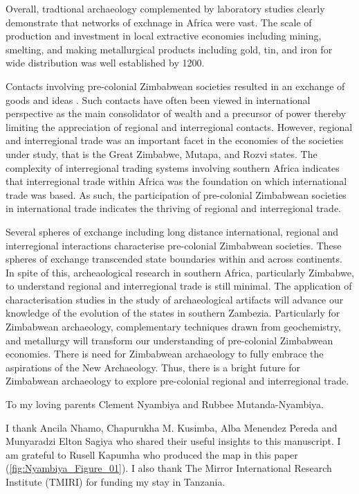 Overall, tradtional archaeology complemented by laboratory studies clearly demonstrate that networks of exchnage in Africa were vast. The scale of production and investment in local extractive economies including mining, smelting, and making metallurgical products including gold, tin, and iron for wide distribution was well established by 1200\CE.

Contacts involving pre-colonial Zimbabwean societies resulted in an exchange of goods and ideas \parencite{pikirayi2017}. Such contacts have often been viewed in international perspective as the main consolidator of wealth \parencite{manyanga2006} and a precursor of power \parencite{kusimba2017} thereby limiting the appreciation of regional and interregional contacts. However, regional and interregional trade was an important facet in the economies of the societies under study, that is the Great Zimbabwe, Mutapa, and Rozvi states. The complexity of interregional trading systems involving southern Africa indicates that interregional trade within Africa was the foundation on which international trade was based. As such, the participation of pre-colonial Zimbabwean societies in international trade indicates the thriving of regional and interregional trade.

 Several spheres of exchange including long distance international, regional and interregional interactions characterise pre-colonial Zimbabwean societies. These spheres of exchange transcended state boundaries within and across continents.
In spite of this, archeaological research in southern Africa, particularly Zimbabwe, to understand regional and interregional trade is still minimal. The application of characterisation studies in the study of archaeological artifacts will advance our knowledge of the evolution of the states in southern Zambezia. Particularly for Zimbabwean archaeology, complementary techniques drawn from geochemistry, and metallurgy will transform our understanding of pre-colonial Zimbabwean economies. There is need for Zimbabwean archaeology to fully embrace the aspirations of the New Archaeology. Thus, there is a bright future for Zimbabwean archaeology to explore pre-colonial regional and interregional trade.



To my loving parents Clement Nyambiya and Rubbee Mutanda-Nyambiya.

I thank Ancila Nhamo, Chapurukha M. Kusimba,
Alba Menendez Pereda and Munyaradzi Elton Sagiya who shared their useful insights to this manuscript.
I am grateful to Rusell Kapumha who produced the map in this paper (\cref{fig:Nyambiya_Figure_01}).
I also thank The Mirror International Research Institute (TMIRI) for funding my stay in Tanzania.

\IJSRAclosing%
